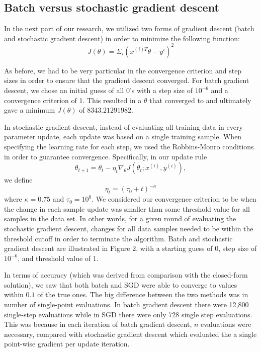 \documentclass{article}
\begin{document}
\subsection{Batch versus stochastic gradient descent}
In the next part of our research, we utilized two forms of gradient descent (batch and stochastic gradient descent) in order to minimize the following function:
$$J(\theta) = \Sigma_{i}(x^{(i)T}\theta - y^{i})^2$$

As before, we had to be very particular in the convergence criterion and step sizes in order to ensure that the gradient descent converged. For batch gradient descent, we chose an initial guess of all $0$'s with a step size of $10^{-6}$ and a convergence criterion of 1. This resulted in a $\theta$ that converged to and ultimately gave a minimum $J(\theta)$ of $8343.21291982$.

In stochastic gradient descent, instead of evaluating all training data in every parameter update, each update was based on a single training sample. When specifying the learning rate for each step, we used the Robbins-Monro conditions in order to guarantee convergence. Specifically, in our update rule
$$\theta_{t+1} = \theta_{t} - \eta_{t}\nabla_{\theta}J(\theta_t; x^{(i)}, y^{(i)}),$$
we define
$$\eta_t = (\tau_0 + t)^{-\kappa}$$
where $\kappa = 0.75$ and $\tau_{0} = 10^{8}$. We considered our convergence criterion to be when the change in each sample update was smaller than some threshold value for all samples in the data set. In other words, for a given round of evaluating the stochastic gradient descent, changes for all data samples needed to be within the threshold cutoff in order to terminate the algorithm. Batch and stochastic gradient descent are illustrated in Figure 2, with a starting guess of 0, step size of $10^{-6}$, and threshold value of 1.

In terms of accuracy (which was derived from comparison with the closed-form solution), we saw that both batch and SGD were able to converge to values within $0.1$ of the true ones. The big difference between the two methods was in number of single-point evaluations. In batch gradient descent there were 12,800 single-step evaluations while in SGD there were only 728 single step evaluations. This was because in each iteration of batch gradient descent, $n$ evaluations were necessary, compared with stochastic gradient descent which evaluated the a single point-wise gradient per update iteration.
\end{document}
